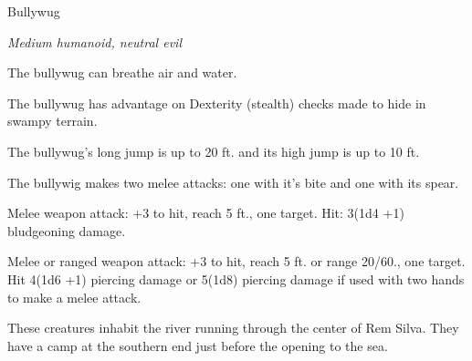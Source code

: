 \begin{monsterbox}{Bullywug}
	\begin{hangingpar}
		\textit{Medium humanoid, neutral evil}
	\end{hangingpar}
	\dndline%
	\basics[%
	armorclass = {15 (hide armor, shield)},
	hitpoints  = 11 (2d8 +2),
	speed      = {20 ft, swim 40 ft.}
	]
	\dndline%
	\stats[
	STR = \stat{12}, %
	DEX = \stat{12},
	CON = \stat{13},
	INT = \stat{7},
	WIS = \stat{10},
	CHA = \stat{7}
	]
	\dndline%
	\details[%
	skills = {stealth +3}
	senses = {passive perception 10},
	challenge = 1/4 (50 XP)
	]
	\dndline%
	\begin{monsteraction}[Amphibious]
		The bullywug can breathe air and water.
	\end{monsteraction}	
	\begin{monsteraction}
		The bullywug has advantage on Dexterity (stealth) checks made to hide in swampy terrain.
	\end{monsteraction}	
	\begin{monsteraction}
		The bullywug's long jump is up to 20 ft. and its high jump is up to 10 ft.
	\end{monsteraction}	

	\begin{monsteraction}[Multiattack]
		The bullywig makes two melee attacks: one with it's bite and one with its spear.
	\end{monsteraction}
	\begin{monsteraction}[Bite]
		Melee weapon attack: +3 to hit, reach 5 ft., one target. Hit: 3(1d4 +1) bludgeoning damage.
	\end{monsteraction}
	\begin{monsteraction}[Spear]
		Melee or ranged weapon attack: +3 to hit, reach 5 ft. or range 20/60., one target. Hit 4(1d6 +1) piercing damage or 5(1d8) piercing damage if used with two hands to make a melee attack. 
	\end{monsteraction}
		These creatures inhabit the river running through the center of Rem Silva. They have a camp at the southern end just before the opening to the sea.
\end{monsterbox}

